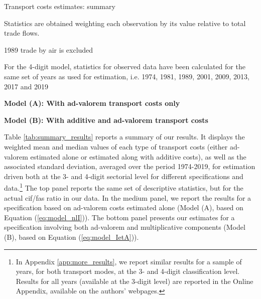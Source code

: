 \documentclass[a4paper,11pt]{article}
\begin{document}
\begin{table}[htbp]
 \centering
\caption{Transport costs estimates: summary} \vspace{5mm} \label{tab:summary_results}

		\begin{tablenotes}
		\scriptsize
		\item Statistics are obtained weighting each observation by its value relative to total trade flows.
		\item 1989 trade by air is excluded
		\item For the  4-digit model, statistics for observed data have been calculated for the same set of years as used for estimation, i.e.
		1974, 1981, 1989, 2001, 2009, 2013, 2017 and 2019
		\item \textbf{Model (A): With ad-valorem transport costs only}
		\item \textbf{Model (B): With additive and ad-valorem transport costs}
	\end{tablenotes}
\end{table}

Table \ref{tab:summary_results} reports a summary of our results.
It displays the weighted mean and median values of each type of transport costs (either ad-valorem estimated alone or estimated along with additive costs), as well as the associated standard deviation, averaged over the period 1974-2019, for estimation driven both at the 3- and 4-digit sectorial level for different specifications and data.\footnote{In Appendix \ref{app:more_results}, we report similar results for a sample of years, for both transport modes, at the 3- and 4-digit classification level. Results for all years (available at the 3-digit level) are reported in the Online Appendix, available on the authors' webpages.}
The top panel reports the same set of descriptive statistics, but for the actual cif/fas ratio in our data. In the medium panel, we report the results for a specification based on ad-valorem costs estimated alone (Model (A), based on Equation (\ref{eq:model_nlI})). The bottom panel presents our estimates for a specification involving both ad-valorem and multiplicative components (Model (B), based on Equation (\ref{eq:model_IetA})).
\end{document}
